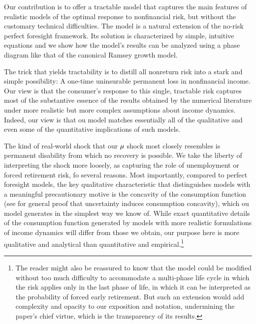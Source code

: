 \documentclass[titlepage,abstract]{\econtex}\newcommand{\texname}{ctDiscrete}
\begin{document}
Our contribution is to offer a tractable model that captures the main
features of realistic models of the optimal response to nonfinancial
risk, but without the customary technical difficulties. The model is a
natural extension of the no-risk perfect foresight framework. Its
solution is characterized by simple, intuitive equations and we show
how the model's results can be analyzed using a phase diagram like
that of the canonical Ramsey growth model.

The trick that yields tractability is to distill all nonreturn risk
into a stark and simple possibility: A one-time uninsurable permanent
loss in nonfinancial income.  Our view is that the consumer's response
to this single, tractable risk captures most of the substantive
essence of the results obtained by the numerical literature under more
realistic but more complex assumptions about income dynamics.  Indeed, our view is that ou
model matches essentially all of the qualitative and even some of the
quantitative implications of such models.
 
The kind of real-world shock that our $\mu$ shock most closely
resembles is permanent disability from which no recovery is possible.
We take the liberty of interpreting the shock more loosely, as
capturing the role of unemployment or forced retirement risk, fo
several reasons.  Most importantly, compared to perfect foresight
models, the key qualitative characteristic that distinguishes models
with a meaningful precautionary motive is the concavity of the
consumption function (see \cite{carroll&kimball:concavity} for general
proof that uncertainty induces consumption concavity), which ou
model generates in the simplest way we know of.  While exact
quantitative details of the consumption function generated by models
with more realistic formulations of income dynamics will differ from
those we obtain, our purpose here is more qualitative and analytical
than quantitative and empirical.\footnote{The reader might also be reassured
to know that the model could be modified without too much difficulty
to accommodate a multi-phase life cycle in which the risk applies only
in the last phase of life, in which it can be interpreted as the
probability of forced early retirement.  But such an extension would
add complexity and opacity to our exposition and notation, undermining
the paper's chief virtue, which is the transparency of its results.}
\end{document}
